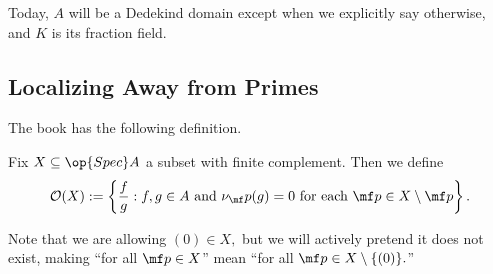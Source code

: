 \documentclass[../notes.tex]{subfiles}
\begin{document}














Today, $A$ will be a Dedekind domain except when we explicitly say otherwise, and $K$ is its fraction field.

\subsection{Localizing Away from Primes}
The book has the following definition.
\begin{definition}
    Fix $X\subseteq\op{Spec}A$ a subset with finite complement. Then we define
    \[\mathcal O(X):=\left\{\frac fg:f,g\in A\text{ and }\nu_\mf p(g)=0\text{ for each }\mf p\in X\setminus\mf p\right\}.\]
\end{definition}
Note that we are allowing $(0)\in X,$ but we will actively pretend it does not exist, making ``for all $\mf p\in X$'' mean ``for all $\mf p\in X\setminus\{(0)\}.$''
\end{document}
